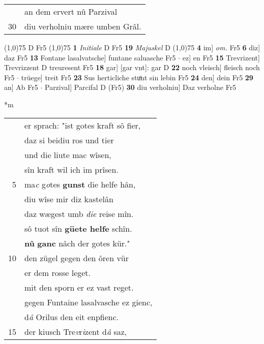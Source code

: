 \documentclass[8pt,a4paper,notitlepage]{article}
\begin{document}
\begin{table}[ht]
\begin{minipage}[t]{0.5\linewidth}
\begin{tabular}{rl}
 & an dem ervert nû Parzival\\ 
30 & diu verholniu mære umben Grâl.\\ 
\end{tabular}
\scriptsize
\line(1,0){75} \newline
D Fr5 \newline
\line(1,0){75} \newline
\textbf{1} \textit{Initiale} D Fr5  \textbf{19} \textit{Majuskel} D  \newline
\line(1,0){75} \newline
\textbf{4} im] \textit{om.} Fr5 \textbf{6} diz] daz Fr5 \textbf{13} Fontane lasalvatsche] funtane saluasche Fr5  $\cdot$ ez] en Fr5 \textbf{15} Trevrizent] Trevrizzent D treuresent Fr5 \textbf{18} gar] [gar vnt]: gar D \textbf{22} noch vleisch] fleisch noch Fr5  $\cdot$ trüege] treit Fr5 \textbf{23} Sus herticliche stuͦnt sin lebin Fr5 \textbf{24} den] dein Fr5 \textbf{29} an] Ab Fr5  $\cdot$ Parzival] Parcifal D (Fr5) \textbf{30} diu verholniu] Daz verholne Fr5 \newline
\end{minipage}
\hspace{0.5cm}
\begin{minipage}[t]{0.5\linewidth}
\small
\begin{center}*m
\end{center}
\begin{tabular}{rl}
 & er sprach: "ist gotes kraft sô fier,\\ 
 & daz si beidiu ros und tier\\ 
 & und die liute mac wîsen,\\ 
 & sîn kraft wil ich im prîsen.\\ 
5 & ma\textit{c} g\textit{o}tes \textbf{gunst} die helfe hân,\\ 
 & diu wîse mir diz kastelân\\ 
 & daz wægest umb \textit{die} reise mîn.\\ 
 & sô tuot sîn \textbf{güete helfe} schîn.\\ 
 & \textbf{nû} \textbf{ganc} nâch der gotes kür."\\ 
10 & den zügel gegen den ôren vür\\ 
 & er dem rosse leget.\\ 
 & mit den sporn er ez vast reget.\\ 
 & gegen Funtaine lasalvasche ez gienc,\\ 
 & d\textit{â} Orilus den eit enpfienc.\\ 
15 & der kiusch Tre\textit{v}r\textit{i}zent d\textit{â} saz,\\ 

\end{tabular}
\end{minipage}
\end{table}
\end{document}
